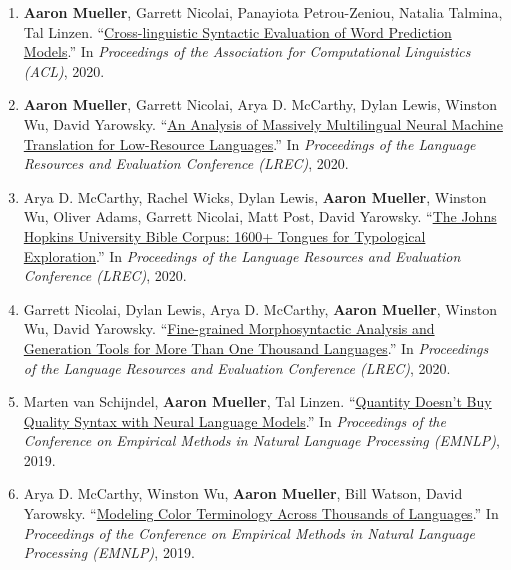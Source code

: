 \documentclass[10pt]{article}
\newcommand{\halfblankline}{\quad\vspace{-0.5\baselineskip}\pagebreak[3]}
\providecommand*\titlelink[2]{\href{#1}{\textcolor{accent}{#2}}}
\begin{document}
\begin{enumerate}[leftmargin=*, topsep=0pt, itemsep=0.25ex, partopsep=0ex, parsep=1ex, label=C\arabic*., ref=C\arabic*]
	\item \textbf{Aaron Mueller}, Garrett Nicolai, Panayiota Petrou-Zeniou, Natalia Talmina, Tal Linzen. ``\titlelink{https://aclanthology.org/2020.acl-main.490/}{Cross-linguistic Syntactic Evaluation of Word Prediction Models}.'' In \emph{Proceedings of the Association for Computational Linguistics (ACL)}, 2020.

	\item \textbf{Aaron Mueller}, Garrett Nicolai, Arya D. McCarthy, Dylan Lewis, Winston Wu, David Yarowsky. ``\titlelink{https://aclanthology.org/2020.lrec-1.458/}{An Analysis of Massively Multilingual Neural Machine Translation for Low-Resource Languages}.'' In \emph{Proceedings of the Language Resources and Evaluation Conference (LREC)}, 2020.

	\item Arya D. McCarthy, Rachel Wicks, Dylan Lewis, \textbf{Aaron Mueller}, Winston Wu, Oliver Adams, Garrett Nicolai, Matt Post, David Yarowsky. ``\titlelink{https://aclanthology.org/2020.lrec-1.352/}{The Johns Hopkins University Bible Corpus: 1600+ Tongues for Typological Exploration}.'' In \emph{Proceedings of the Language Resources and Evaluation Conference (LREC)}, 2020.

	\item Garrett Nicolai, Dylan Lewis, Arya D. McCarthy, \textbf{Aaron Mueller}, Winston Wu, David Yarowsky. ``\titlelink{https://aclanthology.org/2020.lrec-1.488/}{Fine-grained Morphosyntactic Analysis and Generation Tools for More Than One Thousand Languages}.'' In \emph{Proceedings of the Language Resources and Evaluation Conference (LREC)}, 2020.

	\item Marten van Schijndel, \textbf{Aaron Mueller}, Tal Linzen. ``\titlelink{https://aclanthology.org/D19-1592/}{Quantity Doesn't Buy Quality Syntax with Neural Language Models}.'' In \emph{Proceedings of the Conference on Empirical Methods in Natural Language Processing (EMNLP)}, 2019.

	\item Arya D. McCarthy, Winston Wu, \textbf{Aaron Mueller}, Bill Watson, David Yarowsky. ``\titlelink{https://aclanthology.org/D19-1229/}{Modeling Color Terminology Across Thousands of Languages}.'' In \emph{Proceedings of the Conference on Empirical Methods in Natural Language Processing (EMNLP)}, 2019.

	\end{enumerate}

	\halfblankline
\end{document}
